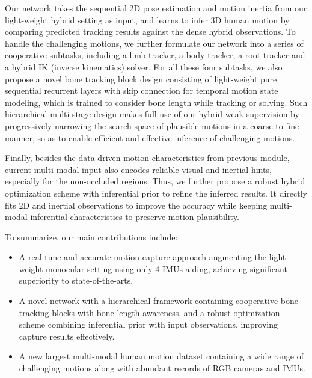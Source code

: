 \documentclass[letterpaper]{article} \usepackage{aaai23}  \usepackage{times}  \usepackage{helvet}  \usepackage{courier}  \usepackage[hyphens]{url}  \usepackage{graphicx} \urlstyle{rm} \def\UrlFont{\rm}  \usepackage{natbib}  \usepackage{caption} \frenchspacing  \setlength{\pdfpagewidth}{8.5in}  \setlength{\pdfpageheight}{11in}  \usepackage{algorithm}
\begin{document}
Our network takes the sequential 2D pose estimation and motion inertia from our light-weight hybrid setting as input, and learns to infer 3D human motion by comparing predicted tracking results against the dense hybrid observations.
To handle the challenging motions, we further formulate our network into a series of cooperative subtasks, including a limb tracker, a body tracker, a root tracker and a hybrid IK (inverse kinematics) solver. 
For all these four subtasks, we also propose a novel bone tracking block design consisting of light-weight pure sequential recurrent layers with skip connection for temporal motion state modeling, which is trained to consider bone length while tracking or solving.
Such hierarchical multi-stage design makes full use of our hybrid weak supervision by progressively narrowing the search space of plausible motions in a coarse-to-fine manner, so as to enable efficient and effective inference of challenging motions.  


Finally, besides the data-driven motion characteristics from previous module, current multi-modal input also encodes reliable visual and inertial hints, especially for the non-occluded regions.
Thus, we further propose a robust hybrid optimization scheme with inferential prior to 
refine the inferred results.
It directly fits 2D and inertial observations to improve the accuracy while keeping multi-modal inferential characteristics to preserve motion plausibility.


To summarize, our main contributions include: 
\begin{itemize} 
\setlength\itemsep{0em}
	\item A real-time and accurate motion capture approach
	augmenting the light-weight monocular setting using only 4 IMUs aiding, achieving significant superiority to state-of-the-arts. 


	\item A novel network with a hierarchical framework containing cooperative bone tracking blocks with bone length awareness, and a robust optimization scheme combining inferential prior with input observations, improving capture results effectively.
	
	\item A new largest multi-modal human motion dataset containing a wide range of challenging motions along with abundant records of RGB cameras and IMUs.

	


\end{itemize} 
\end{document}
